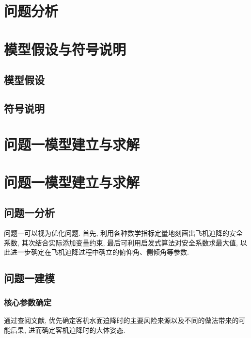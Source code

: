 \documentclass{cumcmthesis}
\begin{document}
\section{问题分析}
\section{模型假设与符号说明}
\subsection{模型假设}
\subsection{符号说明}


\section{问题一模型建立与求解}
\section{问题一模型建立与求解}
\subsection{问题一分析}

问题一可以视为优化问题. 首先, 利用各种数学指标定量地刻画出飞机迫降的安全系数, 其次结合实际添加变量约束, 最后可利用启发式算法对安全系数求最大值, 以此进一步确定在飞机迫降过程中确立的俯仰角、侧倾角等参数. 

\subsection{问题一建模}
\subsubsection{核心参数确定}

通过查阅文献, 优先确定客机水面迫降时的主要风险来源以及不同的做法带来的可能后果, 进而确定客机迫降时的大体姿态. 
\end{document}
